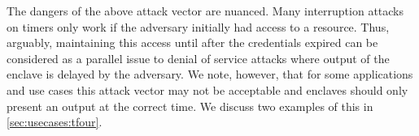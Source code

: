 \documentclass[sigplan,10pt]{acmart}
\begin{document}
The dangers of the above attack vector are nuanced. Many interruption attacks on
\Tthree timers only work if the adversary initially had access to a resource.%
Thus, arguably, maintaining this access until after the
credentials expired can be considered as a parallel issue to denial of service
attacks where output of the enclave is delayed by the adversary. We note,
however, that for some applications and use cases this attack vector may not be
acceptable and enclaves should only present an output at the correct time. We
discuss two examples of this in \cref{sec:usecases:tfour}.



\end{document}
